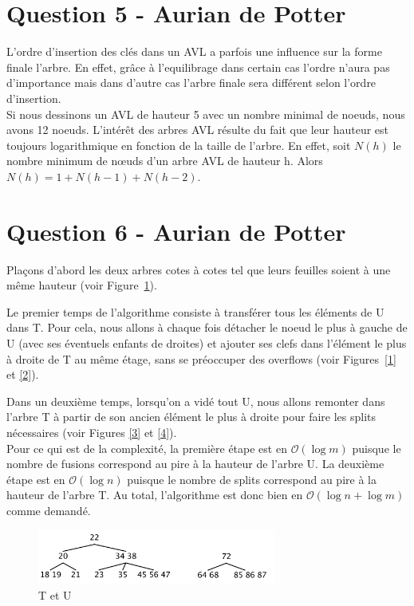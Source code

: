 \documentclass[10pt,a4paper]{article}
\begin{document}
\newpage
\section*{Question 5 - Aurian de Potter}
L'ordre d'insertion des clés dans un AVL a parfois une influence sur la forme finale l'arbre. En effet, grâce à l'equilibrage dans certain cas l'ordre n'aura pas d'importance mais dans d'autre cas l'arbre finale sera différent selon l'ordre d'insertion.\\

Si nous dessinons un AVL de hauteur 5 avec un nombre minimal de noeuds, nous avons 12 noeuds. L’intérêt des arbres AVL résulte du fait que leur hauteur est toujours logarithmique en fonction de la taille de l’arbre. En effet, soit $\mathcal{} N(h)$ le nombre minimum de nœuds d’un arbre AVL de hauteur h. Alors $\mathcal{} N(h) = 1 + N(h-1) + N(h-2)$.

\section*{Question 6 - Aurian de Potter}
Plaçons d'abord les deux arbres cotes à cotes tel que leurs feuilles soient à une même hauteur (voir Figure~\ref{TU}).

Le premier temps de l'algorithme consiste à transférer tous les éléments de U dans T. Pour cela, nous allons à chaque fois détacher le noeud le plus à gauche de U (avec ses éventuels enfants de droites) et ajouter ses clefs dans l'élément le plus à droite de T au même étage, sans se préoccuper des overflows (voir Figures~\ref{1} et \ref{2}).

Dans un deuxième temps, lorsqu'on a vidé tout U, nous allons remonter dans l'arbre T à partir de son ancien élément le plus à droite pour faire les splits nécessaires (voir Figures \ref{3} et \ref{4}).\\

Pour ce qui est de la complexité, la première étape est en $\mathcal{O}(\log m)$ puisque le nombre de fusions correspond au pire à la hauteur de l'arbre U. La deuxième étape est en $\mathcal{O}(\log n)$ puisque le nombre de splits correspond au pire à la hauteur de l'arbre T. Au total, l'algorithme est donc bien en $\mathcal{O}(\log n + \log m)$ comme demandé.

\begin{figure}[!h]
	\begin{center}
		\includegraphics[width=0.7\textwidth]{TU.png}
		\caption{T et U}
		\label{TU}
	\end{center}
\end{figure}
\end{document}
